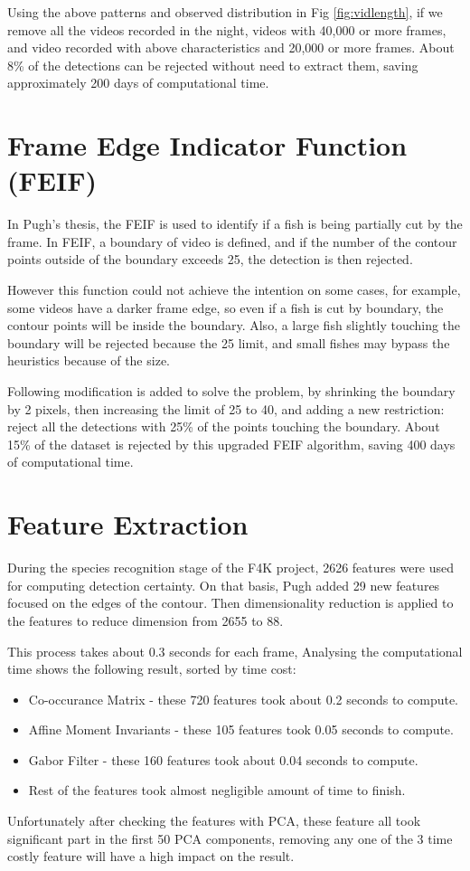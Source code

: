 \documentclass[bsc,logo,twoside,fullspacing,parskip]{infthesis}
\begin{document}
Using the above patterns and observed distribution in Fig \ref{fig:vidlength}, if we remove all the videos recorded in the night, videos with 40,000 or more frames, and video recorded with above characteristics and 20,000 or more frames. About 8\% of the detections can be rejected without need to extract them, saving approximately 200 days of computational time.


\section{Frame Edge Indicator Function (FEIF)}

In Pugh's thesis\cite{Pugh}, the FEIF is used to identify if a fish is being partially cut by the frame. In FEIF, a boundary of video is defined, and if the number of the contour points outside of the boundary exceeds 25, the detection is then rejected.

However this function could not achieve the intention on some cases, for example, some videos have a darker frame edge, so even if a fish is cut by boundary, the contour points will be inside the boundary. Also, a large fish slightly touching the boundary will be rejected because the 25 limit, and small fishes may bypass the heuristics because of the size.

Following modification is added to solve the problem, by shrinking the boundary by 2 pixels, then increasing the limit of 25 to 40, and adding a new restriction: reject all the detections with 25\% of the points touching the boundary. About 15\% of the dataset is rejected by this upgraded FEIF algorithm, saving 400 days of computational time.

\section{Feature Extraction}

During the species recognition stage of the F4K project, 2626 features were used for computing detection certainty.
On that basis, Pugh added 29 new features focused on the edges of the contour. Then dimensionality reduction is applied to the features to reduce dimension from 2655 to 88. 

This process takes about 0.3 seconds for each frame, Analysing the computational time shows the following result, sorted by time cost:
\begin{itemize}
\item
Co-occurance Matrix - these 720 features took about 0.2 seconds to compute.
\item
Affine Moment Invariants - these 105 features took 0.05 seconds to compute.
\item
Gabor Filter - these 160 features took about 0.04 seconds to compute.
\item
Rest of the features took almost negligible amount of time to finish.
\end{itemize}
Unfortunately after checking the features with PCA, these feature all took significant part in the first 50 PCA components, removing any one of the 3 time costly feature will have a high impact on the result.
\end{document}
